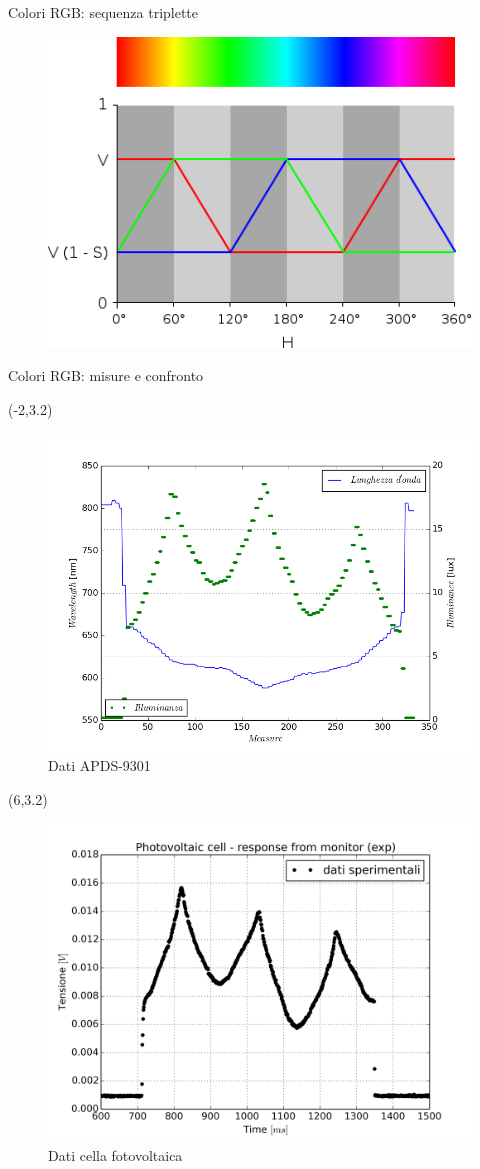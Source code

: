 \documentclass{beamer}
\begin{document}
\begin{frame}{Colori RGB: sequenza triplette}
\centering
\begin{figure}
\includegraphics[scale=.5]{sequence}
\end{figure}
\end{frame}

\begin{frame}{Colori RGB: misure e confronto}
\begin{textblock}{12}(-2,3.2)
\begin{figure}
\centering
\includegraphics[width=0.6\linewidth]{./comparison}
\caption{Dati APDS-9301}
\label{fig:resp}
\end{figure}
\end{textblock}


\begin{textblock}{12}(6,3.2)
\begin{figure}
\centering
\includegraphics[width=0.6\linewidth]{./1_dati_sperimentali}
\caption{Dati cella fotovoltaica}
\label{fig:cal}
\end{figure}
\end{textblock}
\end{frame}
\end{document}
